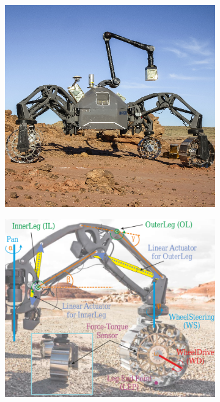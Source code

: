 \begin{figure}[h]
\captionsetup[subfigure]{justification=centering}
\centering
    \setlength{\subfigureWidth}{0.50\textwidth}
    \setlength{\graphicsHeight}{55mm}
    \hypersetup{hidelinks=true}%
    \begin{subfigure}[t]{\subfigureWidth}
        \centering
            \includegraphics[height=\graphicsHeight]{sections/introduction/background/images/sherpa-tt.png}
            \label{fig:sherpatt}
    \end{subfigure}\hfill
    \begin{subfigure}[t]{\subfigureWidth}
        \centering
            \includegraphics[height=\graphicsHeight]{sections/introduction/background/images/sherpatt-actively-articulated-suspension-sytem.png}

\end{subfigure}
\end{figure}
